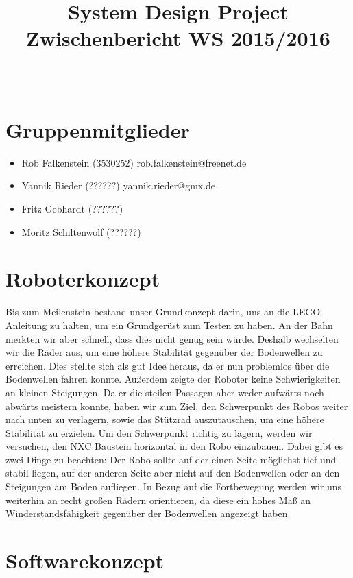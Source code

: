 \documentclass[11pt,a4paper]{article}
\title{
  \Huge System Design Project \\
  \LARGE Zwischenbericht WS 2015/2016
}
\author{
  \Large \todo{Der fühlende Psi Bot \#14}\\
}
\begin{document}
\maketitle

\section{Gruppenmitglieder}
\begin{itemize}
  \item {Rob Falkenstein (3530252) rob.falkenstein@freenet.de}
	\item	{Yannik Rieder (??????) yannik.rieder@gmx.de}
	\item	{Fritz Gebhardt (??????)}
	\item	{Moritz Schiltenwolf (??????)}
\end{itemize}

\section{Roboterkonzept}

Bis zum Meilenstein bestand unser Grundkonzept darin, uns an die LEGO-Anleitung zu halten, um ein Grundgerüst zum Testen zu haben. 
An der Bahn merkten wir aber schnell, dass dies nicht genug sein würde. Deshalb wechselten wir die Räder aus, um eine höhere Stabilität 
gegenüber der Bodenwellen zu erreichen. Dies stellte sich als gut Idee heraus, da er nun problemlos über die Bodenwellen fahren konnte.
Außerdem zeigte der Roboter keine Schwierigkeiten an kleinen Steigungen. Da er die steilen Passagen aber weder aufwärts noch abwärts
meistern konnte, haben wir zum Ziel, den Schwerpunkt des Robos weiter nach unten zu verlagern, sowie das Stützrad auszutauschen, um eine
höhere Stabilität zu erzielen. Um den Schwerpunkt richtig zu lagern, werden wir versuchen, den NXC Baustein horizontal in den Robo
einzubauen. Dabei gibt es zwei Dinge zu beachten: Der Robo sollte auf der einen Seite möglichst tief und stabil liegen, auf der anderen Seite
aber nicht auf den Bodenwellen oder an den Steigungen am Boden aufliegen. 
In Bezug auf die Fortbewegung werden wir uns weiterhin an recht großen Rädern orientieren, da diese ein hohes Maß an Winderstandsfähigkeit
gegenüber der Bodenwellen angezeigt haben.

\section{Softwarekonzept}
\end{document}
